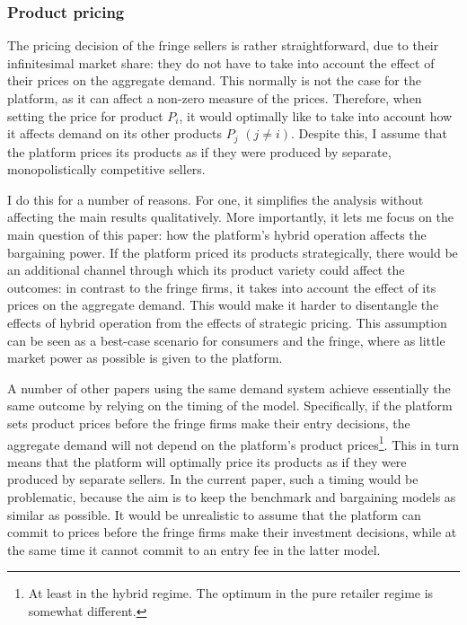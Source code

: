 \documentclass[a4paper]{article}
\begin{document}
\subsubsection{Product pricing}

The pricing decision of the fringe sellers is rather straightforward, due to their infinitesimal market share: they do not have to take into account the effect of their prices on the aggregate demand.
This normally is not the case for the platform, as it can affect a non-zero measure of the prices.
Therefore, when setting the price for product $P_i$, it would optimally like to take into account how it affects demand on its other products $P_j$ $(j \neq i)$.
Despite this, I assume that the platform prices its products as if they were produced by separate, monopolistically competitive sellers.

I do this for a number of reasons.
For one, it simplifies the analysis without affecting the main results qualitatively.  %
More importantly, it lets me focus on the main question of this paper: how the platform's hybrid operation affects the bargaining power.
If the platform priced its products strategically, there would be an additional channel through which its product variety could affect the outcomes: in contrast to the fringe firms, it takes into account the effect of its prices on the aggregate demand.
This would make it harder to disentangle the effects of hybrid operation from the effects of strategic pricing.
This assumption can be seen as a best-case scenario for consumers and the fringe, where as little market power as possible is given to the platform.

A number of other papers using the same demand system \parencite[e.g.][]{anderson2020aggregative,anderson2021hybrid} achieve essentially the same outcome by relying on the timing of the model.
Specifically, if the platform sets product prices before the fringe firms make their entry decisions, the aggregate demand will not depend on the platform's product prices\footnote{
    At least in the hybrid regime.
    The optimum in the pure retailer regime is somewhat different.
}.
This in turn means that the platform will optimally price its products as if they were produced by separate sellers.
In the current paper, such a timing would be problematic, because the aim is to keep the benchmark and bargaining models as similar as possible.
It would be unrealistic to assume that the platform can commit to prices before the fringe firms make their investment decisions, while at the same time it cannot commit to an entry fee in the latter model.
\end{document}
